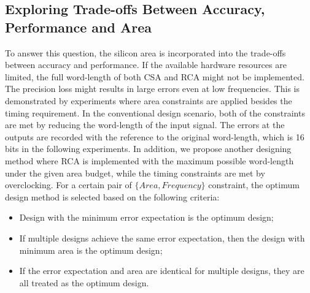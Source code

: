 \documentclass[journal]{IEEEtran}
\begin{document}
\subsection{Exploring Trade-offs Between Accuracy, Performance and Area}
To answer this question, the silicon area is incorporated into the trade-offs between accuracy and performance. If the available hardware resources are limited, the full word-length of both CSA and RCA might not be implemented. The precision loss might results in large errors even at low frequencies. This is demonstrated by experiments where area constraints are applied besides the timing requirement. In the conventional design scenario, both of the constraints are met by reducing the word-length of the input signal. The errors at the outputs are recorded with the reference to the original word-length, which is 16 bits in the following experiments. In addition, we propose another designing method where RCA is implemented with the maximum possible word-length under the given area budget, while the timing constraints are met by overclocking. For a certain pair of $\{Area, Frequency\}$ constraint, the optimum design method is selected based on the following criteria:
\begin{itemize}
  \item Design with the minimum error expectation is the optimum design;
  \item If multiple designs achieve the same error expectation, then the design with minimum area is the optimum design;
  \item If the error expectation and area are identical for multiple designs, they are all treated as the optimum design.
\end{itemize}
\end{document}
